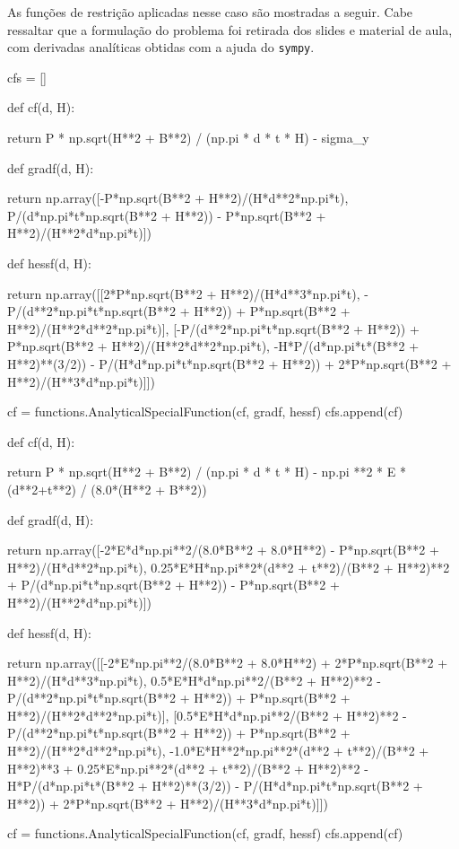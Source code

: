 \documentclass[10pt, a4paper]{article}
\begin{document}
\newpage
As funções de restrição aplicadas nesse caso são mostradas a seguir. Cabe ressaltar que a formulação do problema foi retirada dos slides e material de aula, com derivadas analíticas
obtidas com a ajuda do {\tt sympy}.

\begin{python}
  cfs = []
  
  def cf(d, H):
  
      return P * np.sqrt(H**2 + B**2) / (np.pi * d * t * H) - sigma_y
  
  def gradf(d, H):
  
      return np.array([-P*np.sqrt(B**2 + H**2)/(H*d**2*np.pi*t), P/(d*np.pi*t*np.sqrt(B**2 + H**2)) - P*np.sqrt(B**2 + H**2)/(H**2*d*np.pi*t)])
  
  def hessf(d, H):
  
      return np.array([[2*P*np.sqrt(B**2 + H**2)/(H*d**3*np.pi*t), -P/(d**2*np.pi*t*np.sqrt(B**2 + H**2)) + P*np.sqrt(B**2 + H**2)/(H**2*d**2*np.pi*t)], [-P/(d**2*np.pi*t*np.sqrt(B**2 + H**2)) + P*np.sqrt(B**2 + H**2)/(H**2*d**2*np.pi*t), -H*P/(d*np.pi*t*(B**2 + H**2)**(3/2)) - P/(H*d*np.pi*t*np.sqrt(B**2 + H**2)) + 2*P*np.sqrt(B**2 + H**2)/(H**3*d*np.pi*t)]])
  
  cf = functions.AnalyticalSpecialFunction(cf, gradf, hessf)
  cfs.append(cf)
  
  def cf(d, H):
  
      return P * np.sqrt(H**2 + B**2) / (np.pi * d * t * H) - np.pi **2 * E * (d**2+t**2) / (8.0*(H**2 + B**2))
  
  def gradf(d, H):
  
      return np.array([-2*E*d*np.pi**2/(8.0*B**2 + 8.0*H**2) - P*np.sqrt(B**2 + H**2)/(H*d**2*np.pi*t), 0.25*E*H*np.pi**2*(d**2 + t**2)/(B**2 + H**2)**2 + P/(d*np.pi*t*np.sqrt(B**2 + H**2)) - P*np.sqrt(B**2 + H**2)/(H**2*d*np.pi*t)])
  
  def hessf(d, H):
  
      return np.array([[-2*E*np.pi**2/(8.0*B**2 + 8.0*H**2) + 2*P*np.sqrt(B**2 + H**2)/(H*d**3*np.pi*t), 0.5*E*H*d*np.pi**2/(B**2 + H**2)**2 - P/(d**2*np.pi*t*np.sqrt(B**2 + H**2)) + P*np.sqrt(B**2 + H**2)/(H**2*d**2*np.pi*t)], [0.5*E*H*d*np.pi**2/(B**2 + H**2)**2 - P/(d**2*np.pi*t*np.sqrt(B**2 + H**2)) + P*np.sqrt(B**2 + H**2)/(H**2*d**2*np.pi*t), -1.0*E*H**2*np.pi**2*(d**2 + t**2)/(B**2 + H**2)**3 + 0.25*E*np.pi**2*(d**2 + t**2)/(B**2 + H**2)**2 - H*P/(d*np.pi*t*(B**2 + H**2)**(3/2)) - P/(H*d*np.pi*t*np.sqrt(B**2 + H**2)) + 2*P*np.sqrt(B**2 + H**2)/(H**3*d*np.pi*t)]])
  
  cf = functions.AnalyticalSpecialFunction(cf, gradf, hessf)
  cfs.append(cf)
  \end{python}
\end{document}
